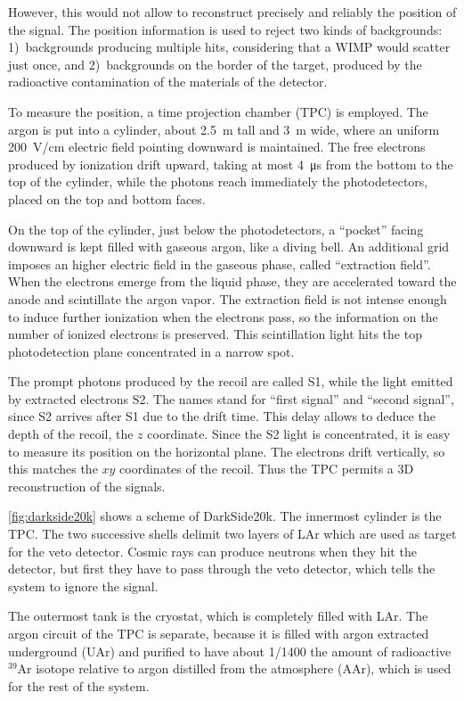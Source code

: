 However, this would not allow to reconstruct precisely and reliably the
position of the signal. The position information is used to reject two kinds of
backgrounds: 1)~backgrounds producing multiple hits, considering that a WIMP
would scatter just once, and 2)~backgrounds on the border of the target,
produced by the radioactive contamination of the materials of the detector.

To measure the position, a time projection chamber (TPC) is employed. The argon
is put into a cylinder, about \SI{2.5}{m} tall and \SI{3}{m} wide, where an
uniform \SI{200}{V/cm} electric field pointing downward is maintained. The free
electrons produced by ionization drift upward, taking at most \SI{4}{\micro s}
from the bottom to the top of the cylinder, while the photons reach immediately
the photodetectors, placed on the top and bottom faces.

On the top of the cylinder, just below the photodetectors, a ``pocket'' facing
downward is kept filled with gaseous argon, like a diving bell. An additional
grid imposes an higher electric field in the gaseous phase, called ``extraction
field''. When the electrons emerge from the liquid phase, they are accelerated
toward the anode and scintillate the argon vapor. The extraction field is not
intense enough to induce further ionization when the electrons pass, so the
information on the number of ionized electrons is preserved. This scintillation
light hits the top photodetection plane concentrated in a narrow spot.

The prompt photons produced by the recoil are called S1, while the light
emitted by extracted electrons S2. The names stand for ``first signal'' and
``second signal'', since S2 arrives after S1 due to the drift time. This delay
allows to deduce the depth of the recoil, the $z$ coordinate. Since the S2
light is concentrated, it is easy to measure its position on the horizontal
plane. The electrons drift vertically, so this matches the $xy$ coordinates
of the recoil. Thus the TPC permits a 3D reconstruction of the signals.

\autoref{fig:darkside20k} shows a scheme of DarkSide20k. The innermost cylinder
is the TPC. The two successive shells delimit two layers of LAr which are used
as target for the veto detector. Cosmic rays can produce neutrons when they hit
the detector, but first they have to pass through the veto detector, which
tells the system to ignore the signal.

The outermost tank is the cryostat, which is completely filled with LAr. The
argon circuit of the TPC is separate, because it is filled with argon extracted
underground (UAr) and purified to have about 1/1400 the amount of radioactive
$^{39}$Ar isotope relative to argon distilled from the atmosphere (AAr), which
is used for the rest of the system.


